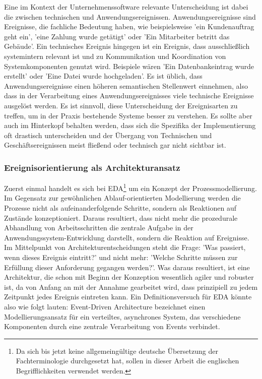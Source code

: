 Eine im Kontext der Unternehmenssoftware relevante Unterscheidung ist dabei die zwischen technischen und Anwendungsereignissen. Anwendungsereignisse sind Ereignisse, die fachliche Bedeutung haben, wie beispielsweise 'ein Kundenauftrag geht ein', 'eine Zahlung wurde getätigt' oder 'Ein Mitarbeiter betritt das Gebäude'. Ein technisches Ereignis hingegen ist ein Ereignis, dass ausschließlich systemintern relevant ist und zu Kommunikation und Koordination von Systemkomponenten genutzt wird. Beispiele wären 'Ein Datenbankeintrag wurde erstellt' oder 'Eine Datei wurde hochgeladen'. Es ist üblich, dass Anwendungsereignisse einen höheren semantischen Stellenwert einnehmen, also dass in der Verarbeitung eines Anwendungsereignisses viele technische Ereignisse ausgelöst werden. \cite[Vgl. ][S. 245f]{CLOUD2021} Es ist sinnvoll, diese Unterscheidung der Ereignisarten zu treffen, um in der Praxis bestehende Systeme besser zu verstehen. Es sollte aber auch im Hinterkopf behalten werden, dass sich die Spezifika der Implementierung oft drastisch unterscheiden und der Übergang von Technischen und Geschäftsereignissen meist fließend oder technisch gar nicht sichtbar ist.
\subsubsection*{Ereignisorientierung als Architekturansatz}
Zuerst einmal handelt es sich bei \ac{EDA}\footnote{Da sich bis jetzt keine allgemeingültige deutsche Übersetzung der Fachterminologie durchgesetzt hat, sollen in dieser Arbeit die englischen Begrifflichkeiten verwendet werden.} um ein Konzept der Prozessmodellierung. Im Gegensatz zur gewöhnlichen Ablauf-orientierten Modellierung werden die Prozesse nicht als aufeinanderfolgende Schritte, sondern als Reaktionen auf Zustände konzeptioniert. Daraus resultiert, dass nicht mehr die prozedurale Abhandlung von Arbeitsschritten die zentrale Aufgabe in der Anwendungssystem-Entwicklung darstellt, sondern die Reaktion auf Ereignisse. Im Mittelpunkt von Architekturentscheidungen steht die Frage: 'Was passiert, wenn dieses Ereignis eintritt?' und nicht mehr: 'Welche Schritte müssen zur Erfüllung dieser Anforderung gegangen werden?'. Was daraus resultiert, ist eine Architektur, die schon mit Beginn der Konzeption wesentlich agiler und robuster ist, da von Anfang an mit der Annahme gearbeitet wird, dass prinzipiell zu jedem Zeitpunkt jedes Ereignis eintreten kann. \cite[Vgl.][S.30]{EDA2010}
Ein Definitionsversuch für \ac{EDA} könnte also wie folgt lauten: Event-Driven Architecture bezeichnet einen Modellierungsansatz für ein verteiltes, asynchrones System, das verschiedene Komponenten durch eine zentrale Verarbeitung von Events verbindet. \cite[Vgl.][S. 248]{CLOUD2021}
